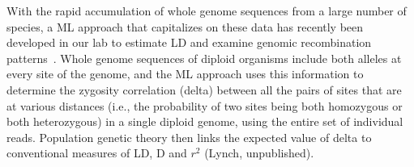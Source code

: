 \documentclass{sig-alternate}
\newcommand{\abhi}[1]{ {\textcolor{red} { ***Abhinav: #1 }}}
\newcommand{\abhi}[1]{ {}}
\begin{document}
With the rapid accumulation of whole genome sequences from a large number of species, a ML approach that capitalizes on these data has recently been developed in our lab to estimate LD and examine genomic recombination patterns~\cite{Lynch01112008,MEC:MEC4482}. Whole genome sequences of diploid organisms include both alleles at every site of the genome, and the ML approach uses this information to determine the zygosity correlation (delta) between all the pairs of sites that are at various distances (i.e., the probability of two sites being both homozygous or both heterozygous) in a single diploid genome, using the entire set of individual reads. Population genetic theory then links the expected value of delta to conventional measures of LD, D and $r^2$ (Lynch, unpublished). 
%
%
%
%
%
%
%
%
%
%
%
%
%
\end{document}
